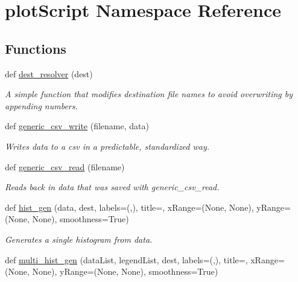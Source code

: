 \hypertarget{namespaceplot_script}{}\section{plot\+Script Namespace Reference}
\label{namespaceplot_script}
\subsection*{Functions}
\begin{DoxyCompactItemize}
\item 
def \mbox{\hyperlink{namespaceplot_script_afba432c3fbc2f0d1f8fe532460142c56}{dest\+\_\+resolver}} (dest)
\begin{DoxyCompactList}\small\item\em A simple function that modifies destination file names to avoid overwriting by appending numbers. \end{DoxyCompactList}\item 
def \mbox{\hyperlink{namespaceplot_script_a053d63ca6e9ca1102330536298125fea}{generic\+\_\+csv\+\_\+write}} (filename, data)
\begin{DoxyCompactList}\small\item\em Writes data to a csv in a predictable, standardized way. \end{DoxyCompactList}\item 
def \mbox{\hyperlink{namespaceplot_script_a91b415187da18ab9e59ddbbff0438a75}{generic\+\_\+csv\+\_\+read}} (filename)
\begin{DoxyCompactList}\small\item\em Reads back in data that was saved with generic\+\_\+csv\+\_\+read. \end{DoxyCompactList}\item 
def \mbox{\hyperlink{namespaceplot_script_a5e18b3c4830942374d0c449071412c1b}{hist\+\_\+gen}} (data, dest, labels=(\textquotesingle{}\textquotesingle{},\textquotesingle{}\textquotesingle{}), title=\textquotesingle{}\textquotesingle{}, x\+Range=(None, None), y\+Range=(None, None), smoothness=True)
\begin{DoxyCompactList}\small\item\em Generates a single histogram from data. \end{DoxyCompactList}\item 
def \mbox{\hyperlink{namespaceplot_script_a46f832890968c50283c4f856dd301eef}{multi\+\_\+hist\+\_\+gen}} (data\+List, legend\+List, dest, labels=(\textquotesingle{}\textquotesingle{},\textquotesingle{}\textquotesingle{}), title=\textquotesingle{}\textquotesingle{}, x\+Range=(None, None), y\+Range=(None, None), smoothness=True)

\end{DoxyCompactItemize}
